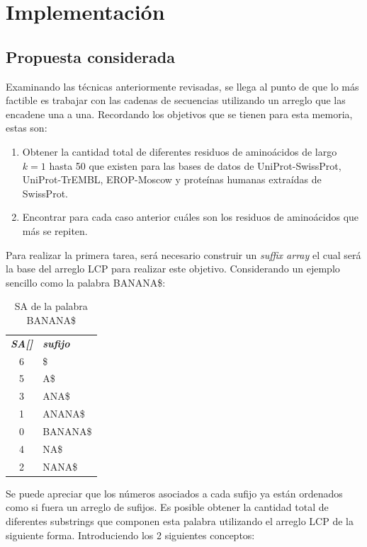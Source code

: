 \chapter{Implementación}

\section{Propuesta considerada}

Examinando las técnicas anteriormente revisadas, se llega al punto de que lo más factible es trabajar con las cadenas de secuencias utilizando un arreglo que las encadene una a una. Recordando los objetivos que se tienen para esta memoria, estas son:

\begin{enumerate}
\item Obtener la cantidad total de diferentes residuos de aminoácidos de largo $k = 1$ hasta 50 que existen para las bases de datos de UniProt-SwissProt, UniProt-TrEMBL, EROP-Moscow y proteínas humanas extraídas de SwissProt.
\item Encontrar para cada caso anterior cuáles son los residuos de aminoácidos que más se repiten.
\end{enumerate}

Para realizar la primera tarea, será necesario construir un \textit{suffix array} el cual será la base del arreglo LCP para realizar este objetivo. Considerando un ejemplo sencillo como la palabra BANANA\$:

\begin{table}[H]
	\centering
	\begin{tabular}{c l}
		\textit{\textbf{SA[]}} & \textit{\textbf{sufijo}}\\
		6 & \$\\
		5 & A\$\\
		3 & ANA\$\\
		1 & ANANA\$\\
		0 & BANANA\$\\
		4 & NA\$\\
		2 & NANA\$\\
	\end{tabular}
	\caption{SA de la palabra BANANA\$}
\end{table}

Se puede apreciar que los números asociados a cada sufijo ya están ordenados como si fuera un arreglo de sufijos. Es posible obtener la cantidad total de diferentes substrings que componen esta palabra utilizando el arreglo LCP de la siguiente forma. Introduciendo los 2 siguientes conceptos:

